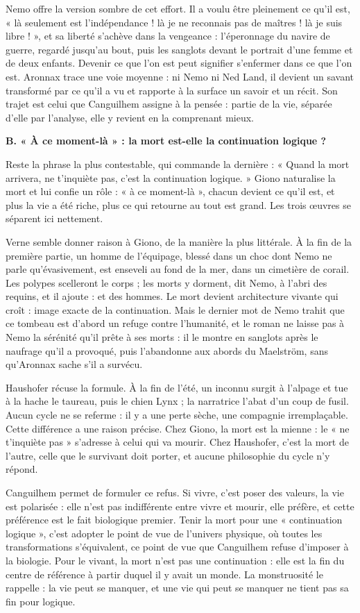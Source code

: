 \documentclass[11pt,a4paper]{article}
\begin{document}
Nemo offre la version sombre de cet effort. Il a voulu être pleinement ce qu'il est, « là seulement est l'indépendance ! là je ne reconnais pas de maîtres ! là je suis libre ! », et sa liberté s'achève dans la vengeance : l'éperonnage du navire de guerre, regardé jusqu'au bout, puis les sanglots devant le portrait d'une femme et de deux enfants. Devenir ce que l'on est peut signifier s'enfermer dans ce que l'on est. Aronnax trace une voie moyenne : ni Nemo ni Ned Land, il devient un savant transformé par ce qu'il a vu et rapporte à la surface un savoir et un récit. Son trajet est celui que Canguilhem assigne à la pensée : partie de la vie, séparée d'elle par l'analyse, elle y revient en la comprenant mieux.

\textbf{B. « À ce moment-là » : la mort est-elle la continuation logique ?}

Reste la phrase la plus contestable, qui commande la dernière : « Quand la mort arrivera, ne t'inquiète pas, c'est la continuation logique. » Giono naturalise la mort et lui confie un rôle : « à ce moment-là », chacun devient ce qu'il est, et plus la vie a été riche, plus ce qui retourne au tout est grand. Les trois œuvres se séparent ici nettement.

Verne semble donner raison à Giono, de la manière la plus littérale. À la fin de la première partie, un homme de l'équipage, blessé dans un choc dont Nemo ne parle qu'évasivement, est enseveli au fond de la mer, dans un cimetière de corail. Les polypes scelleront le corps ; les morts y dorment, dit Nemo, à l'abri des requins, et il ajoute : et des hommes. Le mort devient architecture vivante qui croît : image exacte de la continuation. Mais le dernier mot de Nemo trahit que ce tombeau est d'abord un refuge contre l'humanité, et le roman ne laisse pas à Nemo la sérénité qu'il prête à ses morts : il le montre en sanglots après le naufrage qu'il a provoqué, puis l'abandonne aux abords du Maelström, sans qu'Aronnax sache s'il a survécu.

Haushofer récuse la formule. À la fin de l'été, un inconnu surgit à l'alpage et tue à la hache le taureau, puis le chien Lynx ; la narratrice l'abat d'un coup de fusil. Aucun cycle ne se referme : il y a une perte sèche, une compagnie irremplaçable. Cette différence a une raison précise. Chez Giono, la mort est la mienne : le « ne t'inquiète pas » s'adresse à celui qui va mourir. Chez Haushofer, c'est la mort de l'autre, celle que le survivant doit porter, et aucune philosophie du cycle n'y répond.

Canguilhem permet de formuler ce refus. Si vivre, c'est poser des valeurs, la vie est polarisée : elle n'est pas indifférente entre vivre et mourir, elle préfère, et cette préférence est le fait biologique premier. Tenir la mort pour une « continuation logique », c'est adopter le point de vue de l'univers physique, où toutes les transformations s'équivalent, ce point de vue que Canguilhem refuse d'imposer à la biologie. Pour le vivant, la mort n'est pas une continuation : elle est la fin du centre de référence à partir duquel il y avait un monde. La monstruosité le rappelle : la vie peut se manquer, et une vie qui peut se manquer ne tient pas sa fin pour logique.
\end{document}
